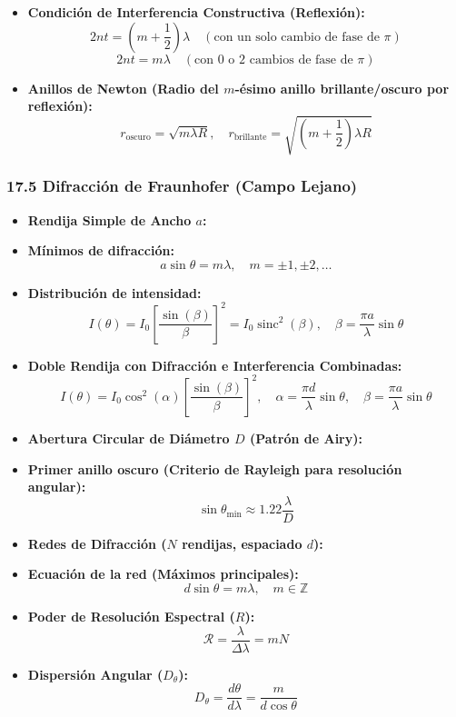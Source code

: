 \documentclass[11pt,a4paper]{article}
\begin{document}
\begin{itemize}
  \item \textbf{Condición de Interferencia Constructiva (Reflexión):}
  \[
    2 n t = \left( m + \frac{1}{2} \right)\lambda \quad (\text{con un solo cambio de fase de } \pi)
  \]
  \[
    2 n t = m \lambda \quad (\text{con } 0 \text{ o } 2 \text{ cambios de fase de } \pi)
  \]
  \item \textbf{Anillos de Newton (Radio del $m$-ésimo anillo brillante/oscuro por reflexión):}
  \[
    r_{\text{oscuro}} = \sqrt{m \lambda R}, \quad r_{\text{brillante}} = \sqrt{\left(m + \frac{1}{2}\right)\lambda R}
  \]
\end{itemize}

\subsubsection*{17.5 Difracción de Fraunhofer (Campo Lejano)}

\begin{itemize}
  \item \textbf{Rendija Simple de Ancho $a$:}
  \item \textbf{Mínimos de difracción:}
  \[
    a \sin\theta = m \lambda, \quad m = \pm 1, \pm 2, \dots
  \]
  \item \textbf{Distribución de intensidad:}
  \[
    I(\theta) = I_0 \left[ \frac{\sin(\beta)}{\beta} \right]^2 = I_0 \operatorname{sinc}^2(\beta), \quad \beta = \frac{\pi a}{\lambda}\sin\theta
  \]
  \item \textbf{Doble Rendija con Difracción e Interferencia Combinadas:}
  \[
    I(\theta) = I_0 \cos^2(\alpha) \left[ \frac{\sin(\beta)}{\beta} \right]^2, \quad \alpha = \frac{\pi d}{\lambda}\sin\theta, \quad \beta = \frac{\pi a}{\lambda}\sin\theta
  \]
  \item \textbf{Abertura Circular de Diámetro $D$ (Patrón de Airy):}
  \item \textbf{Primer anillo oscuro (Criterio de Rayleigh para resolución angular):}
  \[
    \sin\theta_{\min} \approx 1.22 \frac{\lambda}{D}
  \]
  \item \textbf{Redes de Difracción ($N$ rendijas, espaciado $d$):}
  \item \textbf{Ecuación de la red (Máximos principales):}
  \[
    d \sin\theta = m \lambda, \quad m \in \mathbb{Z}
  \]
  \item \textbf{Poder de Resolución Espectral ($R$):}
  \[
    \mathcal{R} = \frac{\lambda}{\Delta\lambda} = m N
  \]
  \item \textbf{Dispersión Angular ($D_\theta$):}
  \[
    D_\theta = \frac{d\theta}{d\lambda} = \frac{m}{d \cos\theta}
  \]
\end{itemize}
\end{document}
